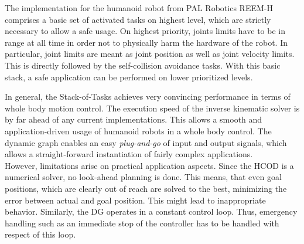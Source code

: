 The implementation for the humanoid robot from PAL Robotics REEM-H comprises a basic set of activated tasks on highest level, which are strictly necessary to allow a safe usage. On highest priority, joints limits have to be in range at all time in order not to physically harm the hardware of the robot. In particular, joint limits are meant as joint position as well as joint velocity limits. This is directly followed by the self-collision avoidance tasks. With this basic stack, a safe application can be performed on lower prioritized levels.

In general, the Stack-of-Tasks achieves very convincing performance in terms of whole body motion control. The execution speed of the inverse kinematic solver is by far ahead of any current implementations. This allows a smooth and application-driven usage of humanoid robots in a whole body control. The dynamic graph enables an easy \textit{plug-and-go} of input and output signals, which allows a straight-forward instantiation of fairly complex applications. \\
However, limitations arise on practical application aspects. Since the HCOD is a numerical solver, no look-ahead planning is done. This means, that even goal positions, which are clearly out of reach are solved to the best, minimizing the error between actual and goal position. This might lead to inappropriate behavior. Similarly, the DG operates in a constant control loop. Thus, emergency handling such as an immediate stop of the controller has to be handled with respect of this loop. 
